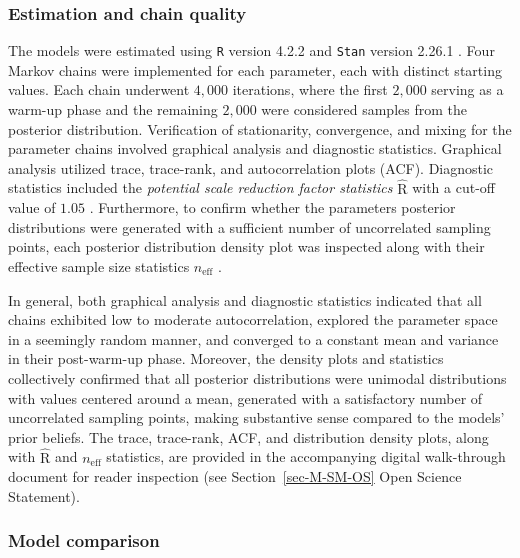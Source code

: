 \documentclass[
  authoryear,
  preprint,
  1p]{elsarticle}
\begin{document}
\subsubsection{Estimation and chain quality}\label{sec-M-SM-CQ}

The models were estimated using \texttt{R} version 4.2.2 \citep{R_2015}
and \texttt{Stan} version 2.26.1 \citep{Stan_2020}. Four Markov chains
were implemented for each parameter, each with distinct starting values.
Each chain underwent \(4,000\) iterations, where the first \(2,000\)
serving as a warm-up phase and the remaining \(2,000\) were considered
samples from the posterior distribution. Verification of stationarity,
convergence, and mixing for the parameter chains involved graphical
analysis and diagnostic statistics. Graphical analysis utilized trace,
trace-rank, and autocorrelation plots (ACF). Diagnostic statistics
included the \emph{potential scale reduction factor statistics}
\(\widehat{\text{R}}\) with a cut-off value of \(1.05\)
\citep{Vehtari_et_al_2021}. Furthermore, to confirm whether the
parameters posterior distributions were generated with a sufficient
number of uncorrelated sampling points, each posterior distribution
density plot was inspected along with their effective sample size
statistics \(n_{\text{eff}}\) \citep{Gelman_et_al_2014}.

In general, both graphical analysis and diagnostic statistics indicated
that all chains exhibited low to moderate autocorrelation, explored the
parameter space in a seemingly random manner, and converged to a
constant mean and variance in their post-warm-up phase. Moreover, the
density plots and statistics collectively confirmed that all posterior
distributions were unimodal distributions with values centered around a
mean, generated with a satisfactory number of uncorrelated sampling
points, making substantive sense compared to the models' prior beliefs.
The trace, trace-rank, ACF, and distribution density plots, along with
\(\widehat{\text{R}}\) and \(n_{\text{eff}}\) statistics, are provided
in the accompanying digital walk-through document for reader inspection
(see Section~\ref{sec-M-SM-OS} Open Science Statement).

\subsubsection{Model comparison}\label{sec-M-SM-MC}
\end{document}
